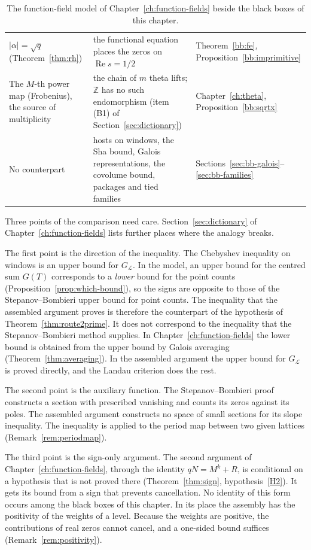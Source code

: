 \documentclass[11pt]{amsbook}
\theoremstyle{plain}
\theoremstyle{definition}
\theoremstyle{remark}
\numberwithin{equation}{section}
\numberwithin{figure}{chapter}
\numberwithin{table}{chapter}
\newcommand{\Z}{\mathbb{Z}}
\newcommand{\lev}{\mathscr{L}}
\begin{document}
\begin{table}[htbp]
\begin{tabular}{@{}>{\raggedright\arraybackslash}p{4.3cm}
  >{\raggedright\arraybackslash}p{4.5cm}
  >{\raggedright\arraybackslash}p{2.9cm}@{}}
$|\alpha|=\sqrt q$ (Theorem~\ref{thm:rh}) &
the functional equation places the zeros on
$\operatorname{Re}s=1/2$ &
Theorem~\ref{bb:fe}, Proposition~\ref{bb:imprimitive}\\
The $M$-th power map (Frobenius), the source of multiplicity &
the chain of $m$ theta lifts; $\Z$ has no such endomorphism (item
(B1) of Section~\ref{sec:dictionary}) &
Chapter~\ref{ch:theta}, Proposition~\ref{bb:sqrtx}\\
No counterpart &
hosts on windows, the Sha bound, Galois representations, the
covolume bound, packages and tied families &
Sections~\ref{sec:bb-galois}--\ref{sec:bb-families}\\
\bottomrule
\end{tabular}
\caption{The function-field model of
Chapter~\ref{ch:function-fields} beside the black boxes of this
chapter.}
\label{tab:bb-model}
\end{table}

Three points of the comparison need care.
Section~\ref{sec:dictionary} of Chapter~\ref{ch:function-fields}
lists further places where the analogy breaks.

The first point is the direction of the inequality. The Chebyshev
inequality on windows is an upper bound for $G_\lev$. In the model,
an upper bound for the centred sum $G(T)$ corresponds to a
\emph{lower} bound for the point counts
(Proposition~\ref{prop:which-bound}), so the signs are opposite to
those of the Stepanov--Bombieri upper bound for point counts. The
inequality that the assembled argument proves is therefore the
counterpart of the hypothesis of Theorem~\ref{thm:route2prime}. It
does not correspond to the inequality that the Stepanov--Bombieri
method supplies. In Chapter~\ref{ch:function-fields} the lower bound
is obtained from the upper bound by Galois averaging
(Theorem~\ref{thm:averaging}). In the assembled argument the upper
bound for $G_\lev$ is proved directly, and the Landau criterion does
the rest.

The second point is the auxiliary function. The Stepanov--Bombieri
proof
constructs a section with prescribed vanishing and counts its zeros
against its poles. The assembled argument constructs no space of
small sections for its slope inequality. The inequality is applied
to the period map between two given lattices
(Remark~\ref{rem:periodmap}).

The third point is the sign-only argument. The second argument of
Chapter~\ref{ch:function-fields}, through the identity
$qN=M^k+R$, is conditional on a hypothesis that is not proved there
(Theorem~\ref{thm:sign}, hypothesis~\ref{H2}). It gets its bound
from a sign that prevents cancellation. No identity of this form
occurs among the black boxes of this chapter. In its place the
assembly has the positivity of the weights of a level. Because the
weights are positive, the contributions of real zeros cannot
cancel, and a one-sided bound suffices
(Remark~\ref{rem:positivity}).
\end{document}

